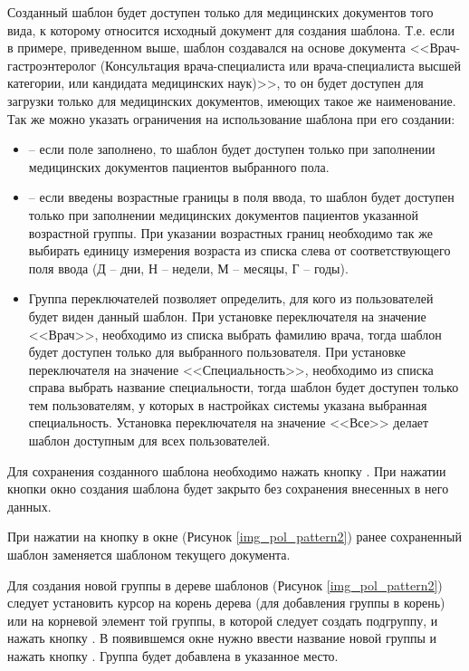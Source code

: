 Созданный шаблон будет доступен только для медицинских документов того вида, к которому относится исходный документ для создания шаблона. Т.е. если в примере, приведенном выше, шаблон создавался на основе документа <<Врач-гастроэнтеролог (Консультация врача-специалиста или врача-специалиста высшей категории, или кандидата медицинских наук)>>, то он будет доступен для загрузки только для медицинских документов, имеющих такое же наименование. Так же можно указать ограничения на использование шаблона при его создании:
\begin{itemize}
 \item {} – если поле заполнено, то шаблон будет доступен только при заполнении медицинских документов пациентов выбранного пола.
 \item {} – если введены возрастные границы в поля ввода, то шаблон будет доступен только при заполнении медицинских документов пациентов указанной возрастной группы. При указании возрастных границ необходимо так же выбирать единицу измерения возраста из списка слева от соответствующего поля ввода (Д – дни, Н – недели, М – месяцы, Г – годы).
 \item Группа переключателей  позволяет определить, для кого из пользователей будет виден данный шаблон. При установке переключателя на значение <<Врач>>, необходимо из списка выбрать фамилию врача, тогда шаблон будет доступен только для выбранного пользователя. При установке переключателя на значение <<Специальность>>, необходимо из списка справа выбрать название специальности, тогда шаблон будет доступен только тем пользователям, у которых в настройках системы указана выбранная специальность. Установка переключателя на значение <<Все>> делает шаблон доступным для всех пользователей.
\end{itemize}

Для сохранения созданного шаблона необходимо нажать кнопку . При нажатии кнопки  окно создания шаблона будет закрыто без сохранения внесенных в него данных.

При нажатии на кнопку  в окне  (Рисунок \ref{img_pol_pattern2}) ранее сохраненный шаблон заменяется шаблоном текущего документа.

Для создания новой группы в дереве шаблонов (Рисунок \ref{img_pol_pattern2}) следует установить курсор на корень дерева (для добавления группы в корень) или на корневой элемент той группы, в которой следует создать подгруппу, и нажать кнопку . В появившемся окне нужно ввести название новой группы и нажать кнопку . Группа будет добавлена в указанное место.

